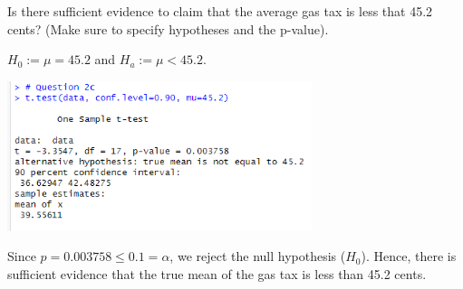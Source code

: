 Is there sufficient evidence to claim that the average gas tax is less that 45.2 cents? (Make sure to
specify hypotheses and the p-value).

\soln* $H_0 := \mu = 45.2$ and $H_a := \mu < 45.2$.

\noindent \includegraphics[width=3.5in]{r_2c.PNG}

\noindent Since $p =0.003758 \leq 0.1 = \alpha$, we reject the null hypothesis ($H_0$). Hence, there is sufficient evidence that the true mean of the gas tax is less than 45.2 cents.